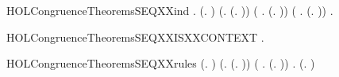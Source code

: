 \newcommand{\HOLCongruenceTheoremsSEQXXcombin}{\UseVerbatim{HOLCongruenceTheoremsSEQXXcombin}}
\begin{SaveVerbatim}{HOLCongruenceTheoremsSEQXXind}
\HOLTokenTurnstile{} \HOLSymConst{\HOLTokenForall{}}.
        (\HOLTokenLambda{}. ) \HOLSymConst{\HOLTokenConj{}} (\HOLSymConst{\HOLTokenForall{}}.  (\HOLTokenLambda{}. )) \HOLSymConst{\HOLTokenConj{}}
       (\HOLSymConst{\HOLTokenForall{}} .   \HOLSymConst{\HOLTokenImp{}}  (\HOLTokenLambda{}.  )) \HOLSymConst{\HOLTokenConj{}}
       (\HOLSymConst{\HOLTokenForall{}} .   \HOLSymConst{\HOLTokenConj{}}   \HOLSymConst{\HOLTokenImp{}}  (\HOLTokenLambda{}.   \HOLSymConst{\ensuremath{+}}  )) \HOLSymConst{\HOLTokenImp{}}
       \HOLSymConst{\HOLTokenForall{}}.   \HOLSymConst{\HOLTokenImp{}}  
\end{SaveVerbatim}
\newcommand{\HOLCongruenceTheoremsSEQXXind}{\UseVerbatim{HOLCongruenceTheoremsSEQXXind}}
\begin{SaveVerbatim}{HOLCongruenceTheoremsSEQXXISXXCONTEXT}
\HOLTokenTurnstile{} \HOLSymConst{\HOLTokenForall{}}.   \HOLSymConst{\HOLTokenImp{}}  
\end{SaveVerbatim}
\newcommand{\HOLCongruenceTheoremsSEQXXISXXCONTEXT}{\UseVerbatim{HOLCongruenceTheoremsSEQXXISXXCONTEXT}}
\begin{SaveVerbatim}{HOLCongruenceTheoremsSEQXXrules}
\HOLTokenTurnstile{}  (\HOLTokenLambda{}. ) \HOLSymConst{\HOLTokenConj{}} (\HOLSymConst{\HOLTokenForall{}}.  (\HOLTokenLambda{}. )) \HOLSymConst{\HOLTokenConj{}}
   (\HOLSymConst{\HOLTokenForall{}} .   \HOLSymConst{\HOLTokenImp{}}  (\HOLTokenLambda{}.  )) \HOLSymConst{\HOLTokenConj{}}
   \HOLSymConst{\HOLTokenForall{}} .   \HOLSymConst{\HOLTokenConj{}}   \HOLSymConst{\HOLTokenImp{}}  (\HOLTokenLambda{}.   \HOLSymConst{\ensuremath{+}}  )
\end{SaveVerbatim}
